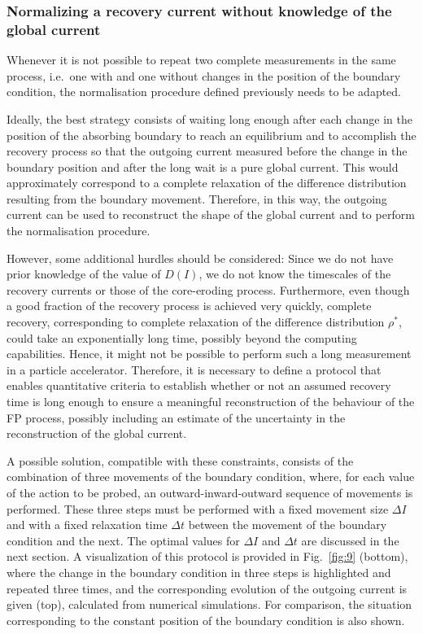 {%

\subsubsection{Normalizing a recovery current without knowledge of the global current}


Whenever it is not possible to repeat two complete measurements in the same process, i.e.\ one with and one without changes in the position of the boundary condition, the normalisation procedure defined previously needs to be adapted.

Ideally, the best strategy consists of waiting long enough after each change in the position of the absorbing boundary to reach an equilibrium and to accomplish the recovery process so that the outgoing current measured before the change in the boundary position and after the long wait is a pure global current. This would approximately correspond to a complete relaxation of the difference distribution resulting from the boundary movement. Therefore, in this way, the outgoing current can be used to reconstruct the shape of the global current and to perform the normalisation procedure.

However, some additional hurdles should be considered: Since we do not have prior knowledge of the value of $D(I)$, we do not know the timescales of the recovery currents or those of the core-eroding process. Furthermore, even though a good fraction of the recovery process is achieved very quickly, complete recovery, corresponding to complete relaxation of the difference distribution $\rho^\ast$, could take an exponentially long time, possibly beyond the computing capabilities. Hence, it might not be possible to perform such a long measurement in a particle accelerator. Therefore, it is necessary to define a protocol that enables quantitative criteria to establish whether or not an assumed recovery time is long enough to ensure a meaningful reconstruction of the behaviour of the FP process, possibly including an estimate of the uncertainty in the reconstruction of the global current.

A possible solution, compatible with these constraints, consists of the combination of three movements of the boundary condition, where, for each value of the action to be probed, an outward-inward-outward sequence of movements is performed. These three steps must be performed with a fixed movement size $\Delta I$ and with a fixed relaxation time $\Delta t$ between the movement of the boundary condition and the next. The optimal values for $\Delta I$ and $\Delta t$ are discussed in the next section. A visualization of this protocol is provided in Fig.~\ref{fig:9} (bottom), where the change in the boundary condition in three steps is highlighted and repeated three times, and the corresponding evolution of the outgoing current is given (top), calculated from numerical simulations. For comparison, the situation corresponding to the constant position of the boundary condition is also shown.

}
